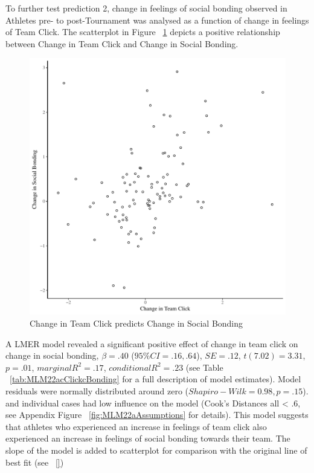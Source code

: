 \begin{landscape}
To further test prediction 2, change in feelings of social bonding observed in Athletes pre- to post-Tournament was analysed as a function of change in feelings of Team Click. The scatterplot in Figure ~\ref{fig:clickBondDeltaBasicXY} depicts a positive relationship between Change in Team Click and Change in Social Bonding.

    \begin{figure}[htbp]
    \includegraphics[width = \linewidth]{images/clickBondDeltaBasicXY.pdf}
      \caption{Change in Team Click predicts Change in Social Bonding}
      \label{fig:clickBondDeltaBasicXY}
    \end{figure}

A LMER model revealed a significant positive effect of change in team click on change in social bonding, $\beta = .40$ ($95\% CI =  .16, .64$), $SE = .12$, $t(7.02) = 3.31$, $p = .01$, $marginal R^2 = .17$, $conditional R^2 = .23$ (see Table ~\ref{tab:MLM22acClickcBonding} for a full description of model estimates).  Model residuals were normally distributed around zero ($Shapiro-Wilk = 0.98, p = .15$). and individual cases had low influence on the model (Cook's Distances all < .6, see Appendix Figure ~\ref{fig:MLM22aAssumptions} for details). This model suggests that athletes who experienced an increase in feelings of team click also experienced an increase in feelings of social bonding towards their team.  The slope of the model is added to scatterplot for comparison with the original line of best fit (see ~\ref{})


\end{landscape}
